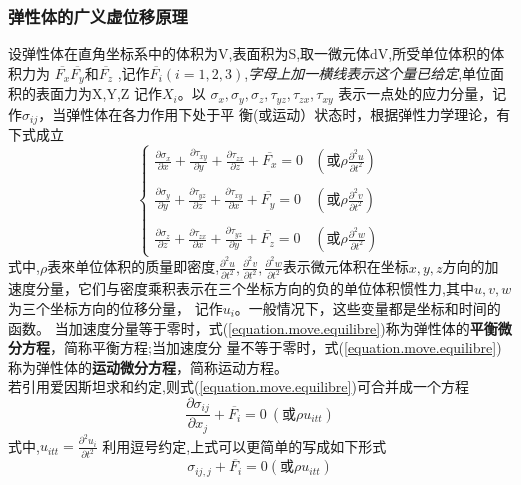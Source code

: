 \documentclass{article}
\begin{document}
\subsubsection{弹性体的广义虚位移原理}
设弹性体在直角坐标系中的体积为V,表面积为S,取一微元体dV,所受单位体积的体积力为 $\overline{F_x} \overline{F_y}\mbox{和} \overline{F_z} $ ,记作$\overline{F_i}(i=1,2,3)$,\emph{字母上加一横线表示这个量已给定},单位面积的表面力为X,Y,Z 记作$X_i$。以
$ \sigma_x, \sigma_y, \sigma_z, \tau_{yz},\tau_{zx},\tau_{xy} $
表示一点处的应力分量，记作$\sigma_{ij}$，当弹性体在各力作用下处于平 衡(或运动）状态时，根据弹性力学理论，有下式成立
\begin{equation}
  \left\{
	\begin{array}{ll}
	 \frac{\partial \sigma_x}{\partial x}+ \frac{\partial \tau_{xy}}{\partial y}+ \frac{\partial \tau_{zx}}{\partial z}+ \overline{F_x}=0 & (\mbox{或}\rho\frac{\partial ^2u}{\partial t^2}) \\\\
	 \frac{\partial \sigma_y}{\partial y}+ \frac{\partial \tau_{yz}}{\partial z}+ \frac{\partial \tau_{xy}}{\partial x}+ \overline{F_y}=0 & (\mbox{或}\rho\frac{\partial ^2v}{\partial t^2}) \\\\
	 \frac{\partial \sigma_z}{\partial z}+ \frac{\partial \tau_{zx}}{\partial x}+ \frac{\partial \tau_{yz}}{\partial y}+ \overline{F_z}=0 & (\mbox{或}\rho\frac{\partial ^2w}{\partial t^2})
	\end{array}
	\right.
\label{equation.move.equilibre}
\end{equation}
式中,$\rho$表來单位体积的质量即密度,$\frac{\partial ^2u}{\partial t^2},\frac{\partial ^2v}{\partial t^2},\frac{\partial ^2w}{\partial t^2}$表示微元体积在坐标$x,y,z$方向的加速度分量，它们与密度乘积表示在三个坐标方向的负的单位体积惯性力,其中$u,v,w$为三个坐标方向的位移分量，
记作$u_i$。一般情况下，这些变量都是坐标和时间的函数。
当加速度分量等于零时，式(\ref{equation.move.equilibre})称为弹性体的\textbf{平衡微分方程}，简称平衡方程;当加速度分
量不等于零时，式(\ref{equation.move.equilibre})称为弹性体的\textbf{运动微分方程}，简称运动方程。
\\
若引用爱因斯坦求和约定,则式(\ref{equation.move.equilibre})可合并成一个方程
\begin{equation}
 \frac{\partial \sigma_{ij}}{\partial x_j} + \overline{F_i}=0 ~(\mbox{或}\rho u_{itt})
\end{equation}
式中,$u_{itt}=\frac{\partial ^2 u_i}{\partial t^2}$
利用逗号约定,上式可以更简单的写成如下形式
\begin{equation}
 \sigma_{ij,j} + \overline{F_i}=0 (\mbox{或}\rho u_{itt})
\end{equation}
\end{document}
